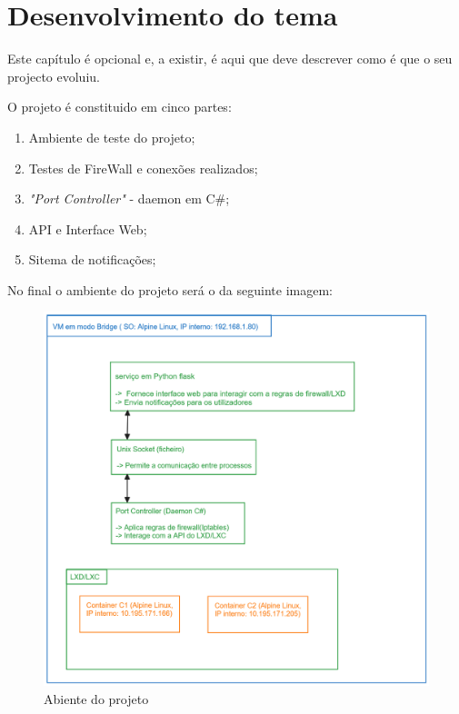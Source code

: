 \chapter{Desenvolvimento do tema}
\label{cap:experiments}

Este capítulo é opcional e, a existir, é aqui que deve descrever como é que o seu projecto evoluiu.

O projeto é constituido em cinco partes:

\begin{enumerate}
    \item Ambiente de teste do projeto;
    \item Testes de FireWall e conexões realizados;
    \item \textit{"Port Controller"} - daemon em C\#;
    \item API e Interface Web;
    \item Sitema de notificações;
\end{enumerate}


No final o ambiente do projeto será o da seguinte imagem:

\begin{figure}[H]
\begin{center}
\includegraphics[width=14cm]{figs/estrutura2.png}
\caption{Abiente do projeto}
\label{fig:bookstack}
\end{center}
\end{figure}



